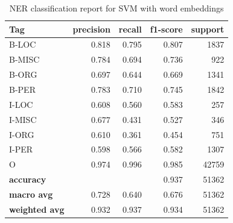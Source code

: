 \documentclass[11pt]{article}
\begin{document}
\begin{table}[h]
    \centering
    \caption{NER classification report for SVM with word embeddings}
    \label{tab:evaluation report SVM embeddings}
    \begin{tabular}{l rrrr}
        \toprule
        \textbf{Tag}          & \textbf{precision}   & \textbf{recall} & \textbf{f1-score} & \textbf{support} \\
        \midrule
        B-LOC                 & 0.818                & 0.795           & 0.807             & 1837             \\
        B-MISC                & 0.784                & 0.694           & 0.736             & 922              \\
        B-ORG                 & 0.697                & 0.644           & 0.669             & 1341             \\
        B-PER                 & 0.783                & 0.710           & 0.745             & 1842             \\
        I-LOC                 & 0.608                & 0.560           & 0.583             & 257              \\
        I-MISC                & 0.677                & 0.431           & 0.527             & 346              \\
        I-ORG                 & 0.610                & 0.361           & 0.454             & 751              \\
        I-PER                 & 0.598                & 0.566           & 0.582             & 1307             \\
        O                     & 0.974                & 0.996           & 0.985             & 42759            \\
        \midrule
        \textbf{accuracy}     & \multicolumn{2}{c}{} & 0.937           & 51362                                \\
        \textbf{macro avg}    & 0.728                & 0.640           & 0.676             & 51362            \\
        \textbf{weighted avg} & 0.932                & 0.937           & 0.934             & 51362            \\
        \bottomrule
    \end{tabular}
\end{table}
\end{document}
